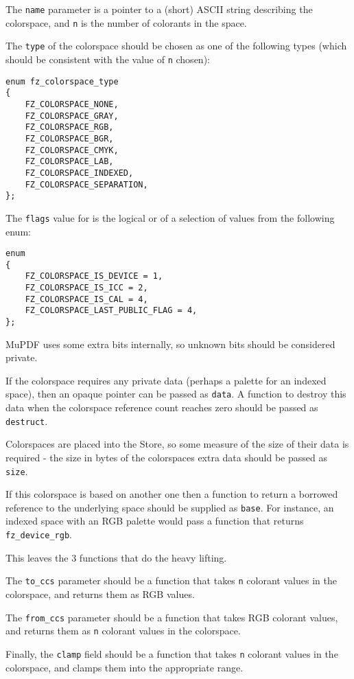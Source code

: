\documentclass[oneside]{book}
\begin{document}
The \texttt{name} parameter is a pointer to a (short) ASCII string describing the colorspace, and \texttt{n} is the number of colorants in the space.

The \texttt{type} of the colorspace should be chosen as one of the following types (which should be consistent with the value of \texttt{n} chosen):

\begin{lstlisting}
enum fz_colorspace_type
{
	FZ_COLORSPACE_NONE,
	FZ_COLORSPACE_GRAY,
	FZ_COLORSPACE_RGB,
	FZ_COLORSPACE_BGR,
	FZ_COLORSPACE_CMYK,
	FZ_COLORSPACE_LAB,
	FZ_COLORSPACE_INDEXED,
	FZ_COLORSPACE_SEPARATION,
};
\end{lstlisting}

The \texttt{flags} value for is the logical or of a selection of values from the following enum:

\begin{lstlisting}
enum
{
	FZ_COLORSPACE_IS_DEVICE = 1,
	FZ_COLORSPACE_IS_ICC = 2,
	FZ_COLORSPACE_IS_CAL = 4,
	FZ_COLORSPACE_LAST_PUBLIC_FLAG = 4,
};
\end{lstlisting}

MuPDF uses some extra bits internally, so unknown bits should be considered private.

If the colorspace requires any private data (perhaps a palette for an indexed space), then an opaque pointer can be passed as \texttt{data}. A function to destroy this data when the colorspace reference count reaches zero should be passed as \texttt{destruct}.

Colorspaces are placed into the Store, so some measure of the size of their data is required - the size in bytes of the colorspaces extra data should be passed as \texttt{size}.

If this colorspace is based on another one then a function to return a borrowed reference to the underlying space should be supplied as \texttt{base}. For instance, an indexed space with an RGB palette would pass a function that returns \texttt{fz\_device\_rgb}.

This leaves the 3 functions that do the heavy lifting.

The \texttt{to\_ccs} parameter should be a function that takes \texttt{n} colorant values in the colorspace, and returns them as RGB values.

The \texttt{from\_ccs} parameter should be a function that takes RGB colorant values, and returns them as \texttt{n} colorant values in the colorspace.

Finally, the \texttt{clamp} field should be a function that takes \texttt{n} colorant values in the colorspace, and clamps them into the appropriate range.
\end{document}
